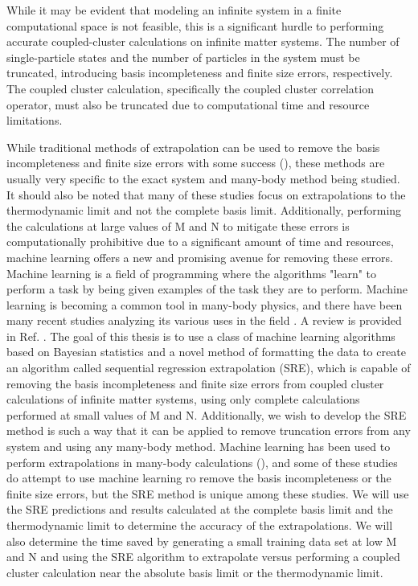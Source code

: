 While it may be evident that modeling an infinite system in a finite computational space is not feasible, this is a significant hurdle to performing accurate coupled-cluster calculations on infinite matter systems. The number of single-particle states and the number of particles in the system must be truncated, introducing basis incompleteness and finite size errors, respectively. The coupled cluster calculation, specifically the coupled cluster correlation operator, must also be truncated due to computational time and resource limitations.

While traditional methods of extrapolation can be used to remove the basis incompleteness and finite size errors with some success (\cite{Ref99, Ref100, Ref96, Ref2, Ref74, Ref86, Ref87, Ref94, Ref98}), these methods are usually very specific to the exact system and many-body method being studied. It should also be noted that many of these studies focus on extrapolations to the thermodynamic limit and not the complete basis limit. Additionally, performing the calculations at large values of M and N to mitigate these errors is computationally prohibitive due to a significant amount of time and resources, machine learning offers a new and promising avenue for removing these errors. Machine learning is a field of programming where the algorithms "learn" to perform a task by being given examples of the task they are to perform. Machine learning is becoming a common tool in many-body physics, and there have been many recent studies analyzing its various uses in the field \cite{Ref6, Ref7, Ref17, Ref22, Ref23,Ref25,Ref28,Ref29,Ref30,Ref31,Ref32, Ref67,Ref81, Ref105, Ref33, Ref106, Ref107, Ref108, Ref117}. A review is provided in Ref. \cite{Ref109}. The goal of this thesis is to use a class of machine learning algorithms based on Bayesian statistics and a novel method of formatting the data to create an algorithm called sequential regression extrapolation (SRE), which is capable of removing the basis incompleteness and finite size errors from coupled cluster calculations of infinite matter systems, using only complete calculations performed at small values of M and N. Additionally, we wish to develop the SRE method is such a way that it can be applied to remove truncation errors from any system and using any many-body method. Machine learning has been used to perform extrapolations in many-body calculations (\cite{Ref67, Ref110, Ref111, Ref112, Ref114, Ref115,Ref6}), and some of these studies do attempt to use machine learning ro remove the basis incompleteness or the finite size errors, but the SRE method is unique among these studies. We will use the SRE predictions and results calculated at the complete basis limit and the thermodynamic limit to determine the accuracy of the extrapolations. We will also determine the time saved by generating a small training data set at low M and N and using the SRE algorithm to extrapolate versus performing a coupled cluster calculation near the absolute basis limit or the thermodynamic limit.

